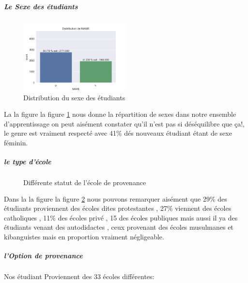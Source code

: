 \subparagraph{Le Sexe des étudiants}
	\begin{figure}[!htbp]
	\centering
	\includegraphics[width=0.5\textwidth]{fig/NAME.png}
	\caption[Short caption]{Distribution du sexe des étudiants }
	\label{fig:SEXE}
\end{figure}
La  la figure la figure \ref{fig:SEXE} nous donne la  répartition de sexes dans notre ensemble d'apprentissage on peut aisément constater qu'il n'est pas si déséquilibre que ça!, le
genre est vraiment respecté avec 41\% dés nouveaux étudiant étant de
sexe féminin.
\subparagraph{le type d'école}
\begin{figure}[!htbp]
	\centering
	\caption[Short caption]{Différente statut de l'école de provenance }
	\label{fig:SchoolStatus}
\end{figure}
 Dans la la figure la figure \ref{fig:SchoolStatus} nous pouvons remarquer aisément que 29\% des étudiants
proviennent des écoles dites protestantes , 27\% viennent des écoles
catholiques , 11\% des écoles privé , 15 des écoles publiques mais aussi
il ya des étudiants venant des autodidactes , ceux provenant des écoles
musulmanes et kibanguistes mais en proportion vraiment négligeable.
\subparagraph{l'Option de provenance}
Nos étudiant Proviennent des 33 écoles différentes:

